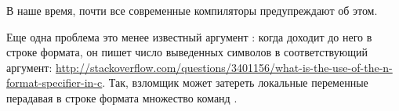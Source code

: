 В наше время, почти все современные компиляторы предупреждают об этом.

Еще одна проблема это менее известный аргумент \printf {}: когда \printf доходит до него в строке формата,
он пишет число выведенных символов в соответствующий аргумент:
\url{http://stackoverflow.com/questions/3401156/what-is-the-use-of-the-n-format-specifier-in-c}.
Так, взломщик может затереть локальные переменные перадавая в строке формата множество команд .

